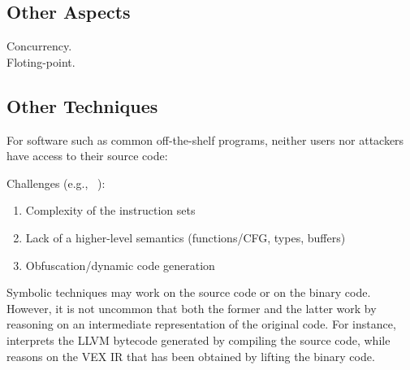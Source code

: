 \subsection{Other Aspects}

Concurrency.\\
Floting-point.


\subsection{Other Techniques}

\missing{} %

\vspace{4em}
 For software such as common off-the-shelf programs, neither users nor attackers have access to their source code: 

Challenges (e.g., ~\cite{BITBLAZE-ICISS08}):
\begin{enumerate}
\item Complexity of the instruction sets
\item Lack of a higher-level semantics (functions/CFG, types, buffers)
\item Obfuscation/dynamic code generation
\end{enumerate}

Symbolic techniques may work on the source code or on the binary code. However, it is not uncommon that both the former and the latter work by reasoning on an intermediate representation of the original code. For instance, ~\cite{KLEE-OSDI08} interprets the LLVM bytecode generated by compiling the source code, while~\cite{ANGR-SP16} reasons on the VEX IR that has been obtained by lifting the binary code.

